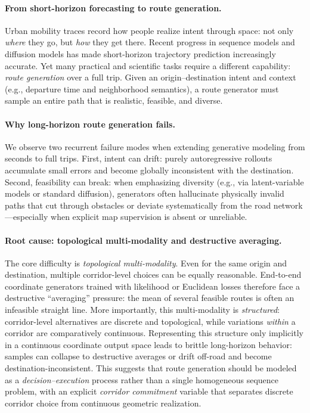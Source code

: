 \paragraph{From short-horizon forecasting to route generation.}
Urban mobility traces record how people realize intent through space: not only \emph{where} they go, but \emph{how} they get there.
Recent progress in sequence models and diffusion models \citep{vaswani2017attention,ho2020ddpm} has made short-horizon trajectory prediction increasingly accurate.
Yet many practical and scientific tasks require a different capability: \emph{route generation} over a full trip.
Given an origin--destination intent and context (e.g., departure time and neighborhood semantics), a route generator must sample an entire path that is realistic, feasible, and diverse.

\paragraph{Why long-horizon route generation fails.}
We observe two recurrent failure modes when extending generative modeling from seconds to full trips.
First, intent can drift: purely autoregressive rollouts accumulate small errors and become globally inconsistent with the destination.
Second, feasibility can break: when emphasizing diversity (e.g., via latent-variable models \citep{kingma2014auto} or standard diffusion), generators often hallucinate physically invalid paths that cut through obstacles or deviate systematically from the road network---especially when explicit map supervision is absent or unreliable.

\paragraph{Root cause: topological multi-modality and destructive averaging.}
The core difficulty is \emph{topological multi-modality}.
Even for the same origin and destination, multiple corridor-level choices can be equally reasonable.
End-to-end coordinate generators trained with likelihood or Euclidean losses therefore face a destructive ``averaging'' pressure: the mean of several feasible routes is often an infeasible straight line.
More importantly, this multi-modality is \emph{structured}: corridor-level alternatives are discrete and topological, while variations \emph{within} a corridor are comparatively continuous.
Representing this structure only implicitly in a continuous coordinate output space leads to brittle long-horizon behavior: samples can collapse to destructive averages or drift off-road and become destination-inconsistent.
This suggests that route generation should be modeled as a \emph{decision--execution} process rather than a single homogeneous sequence problem, with an explicit \emph{corridor commitment} variable that separates discrete corridor choice from continuous geometric realization.

